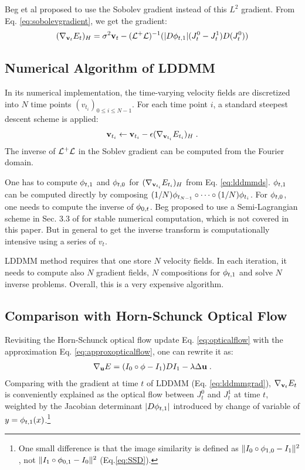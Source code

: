 \documentclass[letterpaper,12pt]{article}
\begin{document}
Beg et al proposed to use the Sobolev gradient instead of this $L^2$ gradient. From Eq. \ref{eq:sobolevgradient}, we get the gradient:
\begin{align}
(\nabla_{\mathbf{v}_t} E_t)_H = \sigma^2 \mathbf{v}_t - (\mathcal{L}^+\mathcal{L})^{-1}(|D\phi_{t,1}|(J_t^0 - J_t^1)D(J_t^0))
\end{align}

\subsection{Numerical Algorithm of LDDMM}
\label{sec:lddmmalg}
In its numerical implementation, the time-varying velocity fields are discretized into $N$ time points $(v_{t_i} )_{0 \leq i \leq N-1}$. For each time point $i$, a standard steepest descent scheme is applied:
\begin{align}
\mathbf{v}_{t_i}  \leftarrow \mathbf{v}_{t_i} - \epsilon (\nabla_{\mathbf{v}_{t_i}} E_{t_i})_H \; .
\end{align}
The inverse of $\mathcal{L}^+\mathcal{L}$ in the Soblev gradient can be computed from the Fourier domain.


One has to compute $\phi_{t,1}$ and $\phi_{t,0}$ for $(\nabla_{\mathbf{v}_{t_i}} E_{t_i})_H$ from Eq. \ref{eq:lddmmds}. $\phi_{t,1}$ can be computed directly by composing $ (1/N)\phi_{t_{N-1}} \circ \cdots \circ (1/N) \phi_{t_{i}}$. For $\phi_{t,0}$, one needs to compute the inverse of $\phi_{0,t}$. Beg proposed to use a  Semi-Lagrangian scheme in Sec. 3.3 of \cite{Beg2005Computing} for stable numerical computation, which is not covered in this paper. But in general to get the inverse transform is computationally intensive using a series of $v_t$. 

LDDMM method requires that one store $N$ velocity fields. In each iteration, it needs to compute also $N$ gradient fields, $N$ compositions for $\phi_{t,1}$ and solve $N$ inverse problems. Overall, this is a very expensive algorithm.


\subsection{Comparison with Horn-Schunck Optical Flow}

Revisiting the Horn-Schunck optical flow update Eq. \ref{eq:opticalflow} with the approximation Eq. \ref{eq:approxopticalflow}, one can rewrite it as:
\begin{align}
\nabla_{\mathbf{u}}E = (I_0 \circ \phi - I_1) DI_1 - \lambda \Delta \mathbf{u} \;.
\end{align}
Comparing with the gradient at time $t$ of LDDMM (Eq. \ref{eq:lddmmgrad}), $\nabla_{\mathbf{v}_t} E_t$ is conveniently explained as the optical flow between $J_t^0$ and $J_t^1$ at time $t$, weighted by the Jacobian determinant $|D\phi_{t,1}|$ introduced by change of variable of $ y = \phi_{t,1}(x)$.\footnote{One small difference is that the image similarity is defined as $\|I_0 \circ \phi_{1,0} - I_1\|^2$, not $\|I_1 \circ \phi_{0,1} - I_0\|^2$ (Eq.\ref{eq:SSD}). } 
\end{document}

